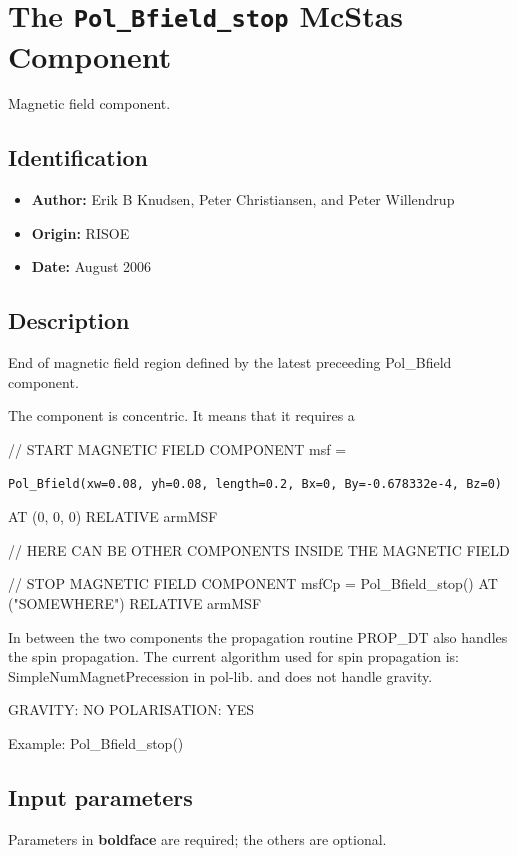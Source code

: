 \section{The \texttt{Pol\_Bfield\_stop} McStas Component}
Magnetic field component.

\subsection*{Identification}
\begin{itemize}
  \item \textbf{Author:} Erik B Knudsen, Peter Christiansen, and Peter Willendrup
  \item \textbf{Origin:} RISOE
  \item \textbf{Date:} August 2006
\end{itemize}

\subsection*{Description}
End of magnetic field region defined by the latest preceeding Pol\_Bfield component.

The component is concentric. It means that it requires a

// START MAGNETIC FIELD COMPONENT msf =

\begin{verbatim}
Pol_Bfield(xw=0.08, yh=0.08, length=0.2, Bx=0, By=-0.678332e-4, Bz=0)
\end{verbatim}

AT (0, 0, 0) RELATIVE armMSF

// HERE CAN BE OTHER COMPONENTS INSIDE THE MAGNETIC FIELD

// STOP MAGNETIC FIELD COMPONENT msfCp = Pol\_Bfield\_stop() AT ("SOMEWHERE") RELATIVE armMSF

In between the two components the propagation routine PROP\_DT also handles the spin propagation. The current algorithm used for spin propagation is: SimpleNumMagnetPrecession in pol-lib. and does not handle gravity.

GRAVITY: NO POLARISATION: YES

Example: Pol\_Bfield\_stop()

\subsection*{Input parameters}
Parameters in \textbf{boldface} are required; the others are optional.

